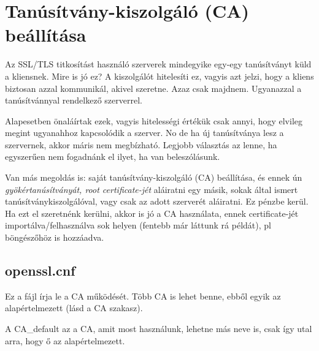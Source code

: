 \chapter{Tanúsítvány-kiszolgáló (CA) beállítása}

Az SSL/TLS titkosítást használó szerverek mindegyike egy-egy tanúsítványt küld a kliensnek. Mire is jó ez? A
kiszolgálót hitelesíti ez, vagyis azt jelzi, hogy a kliens biztosan azzal kommunikál, akivel szeretne. Azaz csak
majdnem. Ugyanazzal a tanúsítvánnyal rendelkező szerverrel.

Alapesetben önaláírtak ezek, vagyis hitelességi értékük csak annyi, hogy elvileg megint ugyanahhoz kapcsolódik a
szerver. No de ha új tanúsítványa lesz a szervernek, akkor máris nem megbízható. Legjobb választás az lenne, ha
egyszerűen nem fogadnánk el ilyet, ha van beleszólásunk.

Van más megoldás is: saját tanúsítvány-kiszolgáló (CA) beállítása, és ennek ún {\em gyökértanúsítványát, root
  certificate-jét} aláiratni egy másik, sokak által ismert tanúsítványkiszolgálóval, vagy csak az adott szerverét
aláiratni. Ez pénzbe kerül. Ha ezt el szeretnénk kerülni, akkor is jó a CA használata, ennek certificate-jét
importálva/felhasználva sok helyen (fentebb már láttunk rá példát), pl böngészőhöz is hozzáadva.

\section{openssl.cnf}
Ez a fájl írja le a CA működését. Több CA is lehet benne, ebből egyik az alapértelmezett (lásd a CA szakasz).

A CA\_default az a CA, amit most használunk, lehetne más neve is, csak így utal arra, hogy ő az alapértelmezett.



